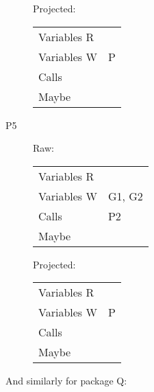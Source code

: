 \documentclass{article}
\begin{document}
\begin{description}
\begin{multicols}{2}
    Projected:
    \begin{tabular}{ll}
      Variables R & \\
      Variables W & P \\
      Calls       & \\
      Maybe       & \\
    \end{tabular}
  \end{multicols}

\item[P5]
  \begin{multicols}{2}
    Raw:
    \begin{tabular}{ll}
      Variables R & \\
      Variables W & G1, G2 \\
      Calls       & P2 \\
      Maybe       & \\
    \end{tabular}

    Projected:
    \begin{tabular}{ll}
      Variables R & \\
      Variables W & P \\
      Calls       & \\
      Maybe       & \\
    \end{tabular}
  \end{multicols}

\end{description}

\noindent
And similarly for package Q:
\end{document}
